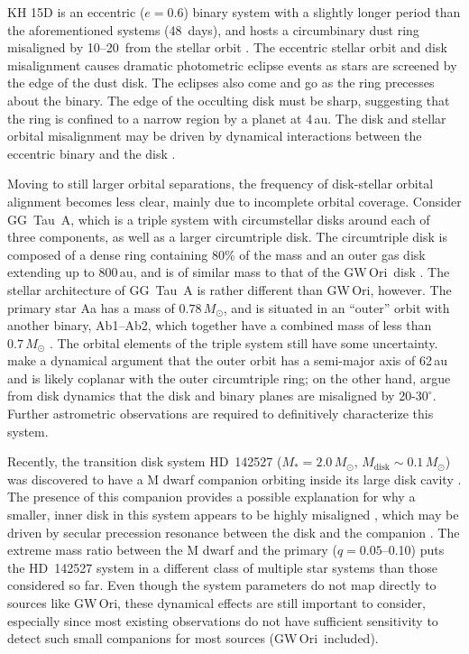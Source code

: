 \documentclass[twocolumn]{aastex61}
\newcommand{\obj}{GW\,Ori}
\begin{document}
KH 15D is an eccentric ($e=0.6$) binary system with a slightly longer period than the aforementioned systems (\mbox{48 days}), and hosts a circumbinary dust ring misaligned by 10--20\degr\ from the stellar orbit \citep{chiang04,capelo12}. The eccentric stellar orbit and disk misalignment causes dramatic photometric eclipse events as stars are screened by the edge of the dust disk. The eclipses also come and go as the ring precesses about the binary. The edge of the occulting disk must be sharp, suggesting that the ring is confined to a narrow region by a planet at 4\,au. The disk and stellar orbital misalignment may be driven by dynamical interactions between the eccentric binary and the disk \citep[e.g.,][]{martin17,zanazzi18}.

Moving to still larger orbital separations, the frequency of disk-stellar orbital alignment becomes less clear, mainly due to incomplete orbital coverage. Consider GG~Tau~A, which is a triple system with circumstellar disks around each of three components, as well as a larger circumtriple disk. The circumtriple disk is composed of a dense ring containing 80\% of the mass and an outer gas disk extending up to 800\,au, and is of similar mass to that of the \obj\ disk \citep[$0.12\,M_\odot$;][]{guilloteau99}. The stellar architecture of GG~Tau~A is rather different than \obj, however. The primary star Aa has a mass of $0.78\,M_\odot$, and is situated in an ``outer'' orbit with another binary, Ab1--Ab2, which together have a combined mass of less than $0.7\,M_\odot$ \citep{dutrey16}. The orbital elements of the triple system still have some uncertainty. \citet{nelson16} make a dynamical argument that the outer orbit has a semi-major axis of 62\,au and is likely coplanar with the outer circumtriple ring; on the other hand, \citet{cazzoletti17} argue from disk dynamics that the disk and binary planes are misaligned by 20-$30^\circ$. Further astrometric observations are required to definitively characterize this system.

Recently, the transition disk system HD~142527 ($M_\ast = 2.0\,M_\odot$, $M_\mathrm{disk} \sim 0.1\,M_\odot$) was discovered to have a M dwarf companion orbiting inside its large disk cavity \citep{biller12,lacour16}. The presence of this companion provides a possible explanation for why a smaller, inner disk in this system appears to be highly misaligned \citep[$\sim$70\degr;][]{avenhaus14,marino15}, which may be driven by secular precession resonance between the disk and the companion \citep{owen17}.
The extreme mass ratio between the M dwarf and the primary ($q = 0.05$--0.10) puts the HD~142527 system in a different class of multiple star systems than those considered so far. Even though the system parameters do not map directly to sources like \obj, these dynamical effects are still important to consider, especially since most existing observations do not have sufficient sensitivity to detect such small companions for most sources (\obj\ included).
\end{document}
